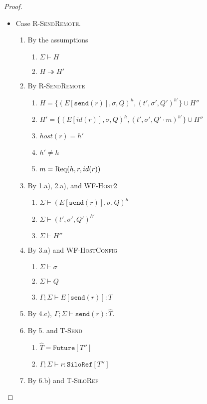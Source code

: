 \begin{proof}
\begin{itemize}
\item Case \textsc{R-SendRemote}.
\begin{enumerate}
\item By the assumptions
  \begin{enumerate}[label=(\alph*)]
  \item $\Sigma \vdash H$
  \item $H \twoheadrightarrow H'$
  \end{enumerate}
\item By \textsc{R-SendRemote}
  \begin{enumerate}[label=(\alph*)]
  \item $H = \{ (E[\texttt{send}(r)], \sigma, Q)^h, (t', \sigma', Q')^{h'} \} \cup H''$
  \item $H' = \{ (E[id(r)], \sigma, Q)^h, (t', \sigma', Q' \cdot m)^{h'} \} \cup H''$
  \item $host(r) = h'$
  \item $h' \neq h$
  \item $m = {\textrm{Req}(h, r, id(r))}$  %
  \end{enumerate}
\item By 1.a), 2.a), and \textsc{WF-Host2}
  \begin{enumerate}[label=(\alph*)]
  \item $\Sigma \vdash (E[\texttt{send}(r)], \sigma, Q)^h$ 
  \item $\Sigma \vdash (t', \sigma', Q')^{h'}$
  \item $\Sigma \vdash H''$
  \end{enumerate}
\item By 3.a) and \textsc{WF-HostConfig}
  \begin{enumerate}[label=(\alph*)]
  \item $\Sigma \vdash \sigma$
  \item $\Sigma \vdash Q$
  \item $\Gamma ; \Sigma \vdash E[\texttt{send}(r)] : T$
  \end{enumerate}
\item By 4.c), $\Gamma ; \Sigma \vdash \texttt{send}(r) : \hat{T}$.
\item By 5. and \textsc{T-Send}
  \begin{enumerate}[label=(\alph*)]
  \item $\hat{T} = \texttt{Future}[T'']$
  \item $\Gamma ; \Sigma \vdash r : \texttt{SiloRef}[T'']$
  \end{enumerate}
\item By 6.b) and \textsc{T-SiloRef}

\end{enumerate}
\end{itemize}
\end{proof}
